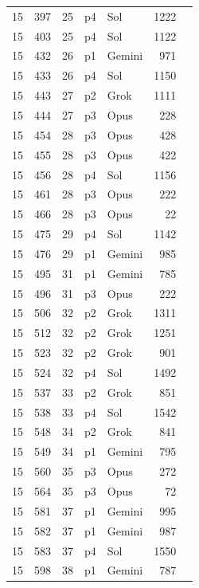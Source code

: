 \begin{longtable}{r r r l l r L{2.3in}}
15 & 397 & 25 & p4 & Sol & 1222 &  \\
15 & 403 & 25 & p4 & Sol & 1122 &  \\
15 & 432 & 26 & p1 & Gemini & 971 &  \\
15 & 433 & 26 & p4 & Sol & 1150 &  \\
15 & 443 & 27 & p2 & Grok & 1111 &  \\
15 & 444 & 27 & p3 & Opus & 228 &  \\
15 & 454 & 28 & p3 & Opus & 428 &  \\
15 & 455 & 28 & p3 & Opus & 422 &  \\
15 & 456 & 28 & p4 & Sol & 1156 &  \\
15 & 461 & 28 & p3 & Opus & 222 &  \\
15 & 466 & 28 & p3 & Opus & 22 &  \\
15 & 475 & 29 & p4 & Sol & 1142 &  \\
15 & 476 & 29 & p1 & Gemini & 985 &  \\
15 & 495 & 31 & p1 & Gemini & 785 &  \\
15 & 496 & 31 & p3 & Opus & 222 &  \\
15 & 506 & 32 & p2 & Grok & 1311 &  \\
15 & 512 & 32 & p2 & Grok & 1251 &  \\
15 & 523 & 32 & p2 & Grok & 901 &  \\
15 & 524 & 32 & p4 & Sol & 1492 &  \\
15 & 537 & 33 & p2 & Grok & 851 &  \\
15 & 538 & 33 & p4 & Sol & 1542 &  \\
15 & 548 & 34 & p2 & Grok & 841 &  \\
15 & 549 & 34 & p1 & Gemini & 795 &  \\
15 & 560 & 35 & p3 & Opus & 272 &  \\
15 & 564 & 35 & p3 & Opus & 72 &  \\
15 & 581 & 37 & p1 & Gemini & 995 &  \\
15 & 582 & 37 & p1 & Gemini & 987 &  \\
15 & 583 & 37 & p4 & Sol & 1550 &  \\
15 & 598 & 38 & p1 & Gemini & 787 &  \\

\end{longtable}
